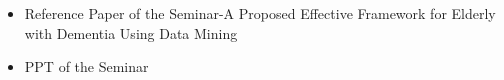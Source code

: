 \chapter*{}

\begin{itemize}
\item Reference Paper of the Seminar-A Proposed Effective Framework for Elderly with Dementia Using Data Mining
\item PPT of the Seminar
\end{itemize}









%

%
%
%
%



%
